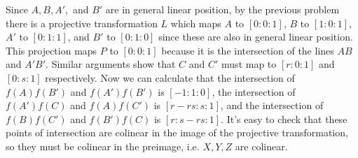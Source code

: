 \documentclass[11pt,letterpaper]{article}
\begin{document}
\begin{solution}
    Since $A, B, A',$ and $B'$ are in general linear position, by the previous problem there is a projective transformation $L$ which maps $A$ to $[0:0:1]$, $B$ to $[1:0:1]$, $A'$ to $[0:1:1]$, and $B'$ to $[0:1:0]$ since these are also in general linear position. This projection maps $P$ to $[0:0:1]$ because it is the intersection of the lines $AB$ and $A'B'$. Similar arguments show that $C$ and $C'$ must map to $[r:0:1]$ and $[0:s:1]$ respectively. Now we can calculate that the intersection of $f(A)f(B')$ and $f(A')f(B')$ is $[-1:1:0]$, the intersection of $f(A')f(C)$ and $f(A)f(C')$ is $[r-rs:s:1]$, and the intersection of $f(B)f(C')$ and $f(B')f(C)$ is $[r:s-rs:1]$. It's easy to check that these points of intersection are colinear in the image of the projective transformation, so they must be colinear in the preimage, i.e. $X,Y,Z$ are colinear.
\end{solution}
\end{document}
